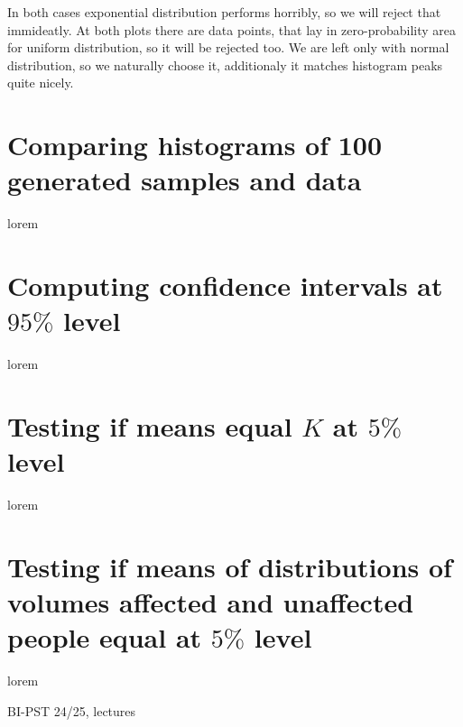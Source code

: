 \documentclass[12pt,a4paper]{article} %
\begin{document}
In both cases exponential distribution performs horribly, so we will reject that immideatly. At both plots there are data points, that lay in zero-probability area for uniform distribution, so it will be rejected too. We are left only with normal distribution, so we naturally choose it, additionaly it matches histogram peaks quite nicely.

\section{Comparing histograms of 100 generated samples and data}

lorem

\section{Computing confidence intervals at $95\%$ level}

lorem

\section{Testing if means equal $K$ at $5\%$ level}

lorem

\section{Testing if means of distributions of volumes affected and unaffected people equal at $5\%$ level}

lorem

\begin{thebibliography}{99}
 BI-PST 24/25, lectures
\end{thebibliography}
\end{document}
